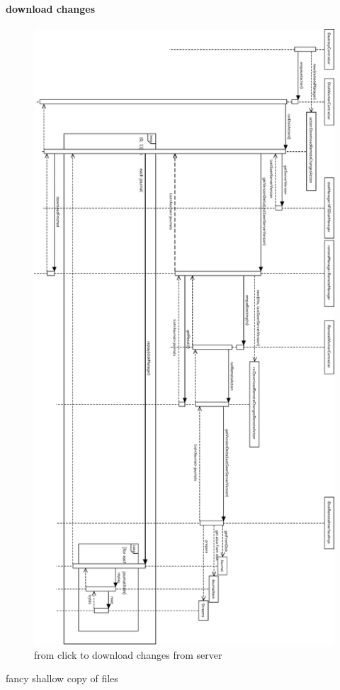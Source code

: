 \paragraph{download changes}
\begin{figure}[h!]
\centering
\includegraphics[height=\textheight,width=\textwidth,keepaspectratio]{figures/22downloadChanges.eps}
\caption{from click to download changes from server}
\label{fig:downloadChanges}
\end{figure}

 fancy shallow copy of files